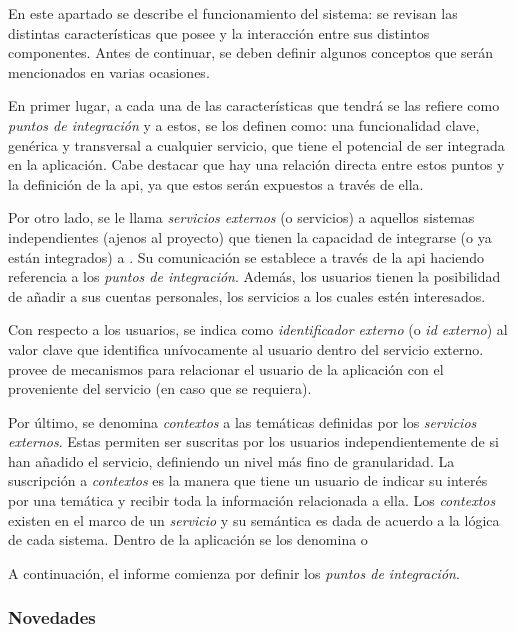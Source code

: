 En este apartado se describe el funcionamiento del sistema: se revisan las distintas características que posee y la interacción entre sus distintos componentes.
Antes de continuar, se deben definir algunos conceptos que serán mencionados en varias ocasiones. 

En primer lugar, a cada una de las características que tendrá \nombreApp{} se las refiere como \textit{puntos de integración} y a estos, se los definen como: una funcionalidad clave, genérica y transversal a cualquier servicio, que tiene el potencial de ser integrada en la aplicación.
Cabe destacar que hay una relación directa entre estos puntos y la definición de la \gls{api}, ya que estos serán expuestos a través de ella. 

Por otro lado, se le llama \textit{servicios externos} (o servicios) a aquellos sistemas independientes (ajenos al proyecto) que tienen la capacidad de integrarse (o ya están integrados) a \nombreApp{}. Su comunicación se establece a través de la \gls{api} haciendo referencia a los \textit{puntos de integración}. Además, los usuarios tienen la posibilidad de añadir a sus cuentas personales, los servicios a los cuales estén interesados. 

Con respecto a los usuarios, se indica como \textit{identificador externo} (o \textit{id externo}) al valor clave que identifica unívocamente al usuario dentro del servicio externo. \nombreApp provee de mecanismos para relacionar el usuario de la aplicación con el proveniente del servicio (en caso que se requiera).

Por último, se denomina \textit{contextos} a las temáticas definidas por los \textit{servicios externos}. Estas permiten ser suscritas por los usuarios independientemente de si han añadido el servicio, definiendo un nivel más fino de granularidad. La suscripción a \textit{contextos} es la manera que tiene un usuario de indicar su interés por una temática y recibir toda la información relacionada a ella.
Los \textit{contextos} existen en el marco de un \textit{servicio} y su semántica es dada de acuerdo a la lógica de cada sistema. Dentro de la aplicación se los denomina  o 

A continuación, el informe comienza por definir los \textit{puntos de integración}.

\subsubsection{Novedades}
\label{funcionalidad_noticias}

